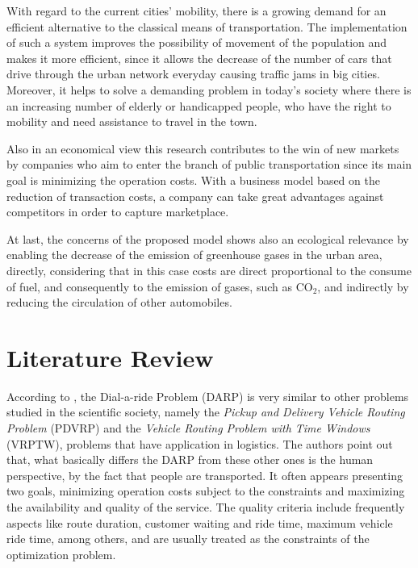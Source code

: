 \documentclass[tuberlin,cic,tc,openright,english,noabntcite,oneside]{iiufrgs}
\begin{document}
With regard to the current cities' mobility, there is a growing demand for an efficient alternative to the classical means of transportation. The implementation of such a system improves the possibility of movement of the population and makes it more efficient, since it allows the decrease of the number of cars that drive through the urban network everyday causing traffic jams in big cities. Moreover, it helps to solve a demanding problem in today's society where there is an increasing number of elderly or handicapped people, who have the right to mobility and need assistance to travel in the town.

Also in an economical view this research contributes to the win of new markets by companies who aim to enter the branch of public transportation since its main goal is minimizing the operation costs. With a business model based on the reduction of transaction costs, a company can take great advantages against competitors in order to capture marketplace.

At last, the concerns of the proposed model shows also an ecological relevance by enabling the decrease of the emission of greenhouse gases in the urban area, directly, considering that in this case costs are direct proportional to the consume of fuel, and consequently to the emission of gases, such as CO$_{2}$, and indirectly by reducing the circulation of other automobiles.

\chapter{Literature Review}
According to \textcite[p. 30]{cordeau_dial--ride_2007}, the Dial-a-ride Problem (DARP) is very similar to other problems studied in the scientific society, namely the \emph{Pickup and Delivery Vehicle Routing Problem} (PDVRP) and the \emph{Vehicle Routing Problem with Time Windows} (VRPTW), problems that have application in logistics. The authors point out that, what basically differs the DARP from these other ones is the human perspective, by the fact that people are transported. It often appears presenting two goals, minimizing operation costs subject to the constraints and maximizing the availability and quality of the service. The quality criteria include frequently aspects like route duration, customer waiting and ride time, maximum vehicle ride time, among others, and are usually treated as the constraints of the optimization problem.
\end{document}
